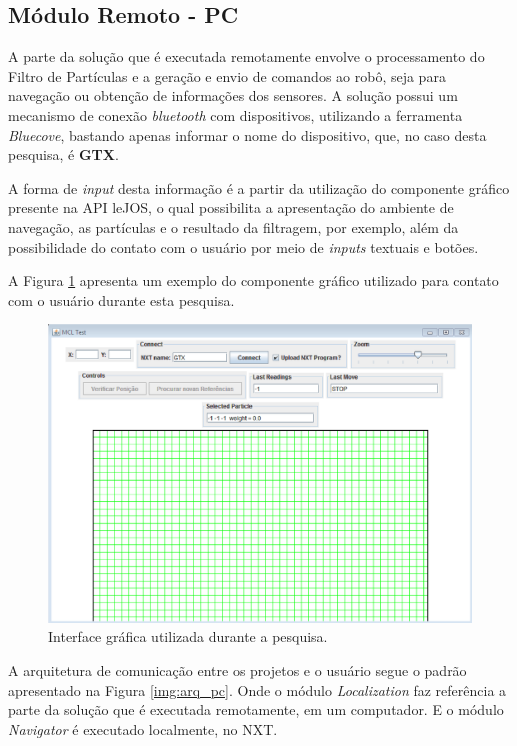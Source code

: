 	\subsection{Módulo Remoto - PC}

		A parte da solução que é executada remotamente envolve o processamento do Filtro de Partículas e a geração e envio de comandos ao robô, seja para navegação
		ou obtenção de informações dos sensores. A solução possui um mecanismo de conexão \textit{bluetooth} com dispositivos, utilizando a ferramenta
		\textit{Bluecove}, bastando apenas informar o nome do dispositivo, que, no caso desta pesquisa, é \textbf{GTX}.

		A forma de \textit{input} desta informação é a partir da utilização do componente gráfico presente na API leJOS, o qual possibilita a apresentação do ambiente de navegação,
		as partículas e o resultado da filtragem, por exemplo, além da possibilidade do contato com o usuário por meio de \textit{inputs} textuais e botões.

		A Figura \ref{img:frame_pc} apresenta um exemplo do componente gráfico utilizado para contato com o usuário durante esta pesquisa.

		\begin{figure}[H]
			\centering
			\includegraphics[scale=0.7]{figuras/frame.eps}
			\caption[Interface Gráfica]{Interface gráfica utilizada durante a pesquisa.}
			\label{img:frame_pc}
		\end{figure}

	A arquitetura de comunicação entre os projetos e o usuário segue o padrão apresentado na Figura \ref{img:arq_pc}. Onde o módulo \textit{Localization}
	faz referência a parte da solução que é executada remotamente, em um computador. E o módulo \textit{Navigator} é executado localmente, no NXT.

